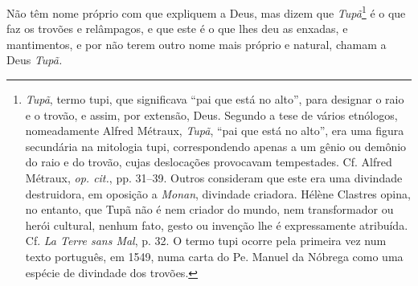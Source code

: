 \begin{linenumbers}
 Não têm nome próprio com que expliquem a Deus, mas dizem que
\textit{Tupã}\footnote{ \textit{Tupã}, termo tupi, que significava
``pai que está no alto'', para designar o raio e o trovão, e assim, por
extensão, Deus. Segundo a tese de vários etnólogos, nomeadamente
Alfred Métraux, \textit{Tupã}, ``pai que está no alto'', era uma figura
secundária na mitologia tupi, correspondendo apenas a um gênio ou
demônio do raio e do trovão, cujas deslocações provocavam tempestades.
Cf. Alfred Métraux, \textit{op. cit.}, pp. 31--39. Outros consideram
que este era uma divindade destruidora, em oposição a \textit{Monan}, 
divindade criadora. Hélène Clastres opina, no entanto, que Tupã não é
nem criador do mundo, nem transformador ou herói cultural, nenhum
fato, gesto ou invenção lhe é expressamente atribuída. Cf. \textit{La
Terre sans Mal}, p. 32. O termo tupi ocorre pela primeira vez num texto
português, em 1549, numa carta do Pe. Manuel da Nóbrega como
uma espécie de divindade dos trovões.} é o que faz os
trovões e relâmpagos, e que este é o que lhes deu as enxadas, e
mantimentos, e por não terem outro nome mais próprio e natural, chamam
a Deus \textit{Tupã.} 


\end{linenumbers}

